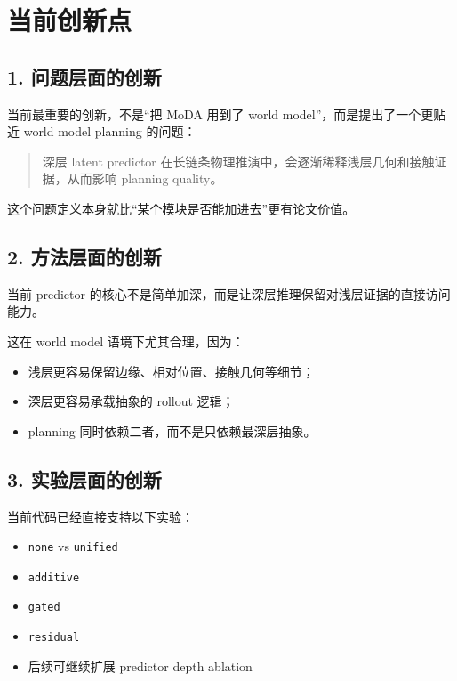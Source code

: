 \documentclass[UTF8,a4paper,11pt]{ctexart}
\begin{document}
\section{当前创新点}

\subsection{1. 问题层面的创新}

当前最重要的创新，不是“把 MoDA 用到了 world model”，而是提出了一个更贴近 world model planning 的问题：

\begin{quote}
深层 latent predictor 在长链条物理推演中，会逐渐稀释浅层几何和接触证据，从而影响 planning quality。
\end{quote}

这个问题定义本身就比“某个模块是否能加进去”更有论文价值。

\subsection{2. 方法层面的创新}

当前 predictor 的核心不是简单加深，而是让深层推理保留对浅层证据的直接访问能力。

这在 world model 语境下尤其合理，因为：

\begin{itemize}[leftmargin=2em]
  \item 浅层更容易保留边缘、相对位置、接触几何等细节；
  \item 深层更容易承载抽象的 rollout 逻辑；
  \item planning 同时依赖二者，而不是只依赖最深层抽象。
\end{itemize}

\subsection{3. 实验层面的创新}

当前代码已经直接支持以下实验：

\begin{itemize}[leftmargin=2em]
  \item \texttt{none} vs \texttt{unified}
  \item \texttt{additive}
  \item \texttt{gated}
  \item \texttt{residual}
  \item 后续可继续扩展 predictor depth ablation
\end{itemize}
\end{document}
